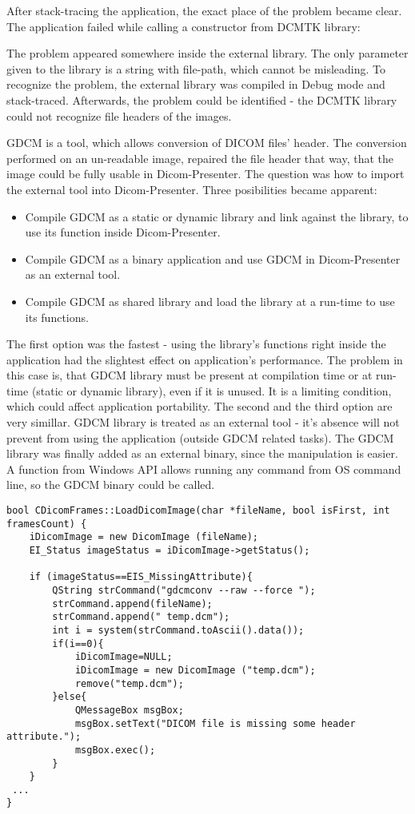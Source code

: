 After stack-tracing the application, the exact place of the problem became clear. The application failed while calling a constructor from DCMTK library:


The problem appeared somewhere inside the external library. The only parameter given to the library is a string with file-path, which cannot be misleading. To recognize the problem, the external library was compiled in Debug mode and stack-traced. Afterwards, the problem could be identified - the DCMTK library could not recognize file headers of the images.

GDCM is a tool, which allows conversion of DICOM files' header. The conversion performed on an un-readable image, repaired the file header that way, that the image could be fully usable in Dicom-Presenter. The question was how to import the external tool into Dicom-Presenter. Three posibilities became apparent:

\begin{itemize}
\item Compile GDCM as a static or dynamic library and link against the library, to use its function inside Dicom-Presenter.
\item Compile GDCM as a binary application and use GDCM in Dicom-Presenter as an external tool.
\item Compile GDCM as shared library and load the library at a run-time to use its functions.
\end{itemize}

The first option was the fastest - using the library's functions right inside the application had the slightest effect on application's performance. The problem in this case is, that GDCM library must be present at compilation time or at run-time (static or dynamic library), even if it is unused. It is a limiting condition, which could affect application portability. The second and the third option are very simillar. GDCM library is treated as an external tool - it's absence will not prevent from using the application (outside GDCM related tasks). The GDCM library was finally added as an external binary, since the manipulation is easier. A  function from Windows  API allows running any command from OS command line, so the GDCM binary could be called.

\begin{lstlisting}[caption={A conversion of DICOM files header using GDCM as external tool.}]
bool CDicomFrames::LoadDicomImage(char *fileName, bool isFirst, int framesCount) {
	iDicomImage = new DicomImage (fileName);
	EI_Status imageStatus = iDicomImage->getStatus();

	if (imageStatus==EIS_MissingAttribute){			
		QString strCommand("gdcmconv --raw --force ");
		strCommand.append(fileName);
		strCommand.append(" temp.dcm");
		int i = system(strCommand.toAscii().data());
		if(i==0){
			iDicomImage=NULL;
			iDicomImage = new DicomImage ("temp.dcm");
			remove("temp.dcm");
		}else{
			QMessageBox msgBox;
			msgBox.setText("DICOM file is missing some header attribute.");
			msgBox.exec();
		}		
	}
 ...
}
\end{lstlisting}